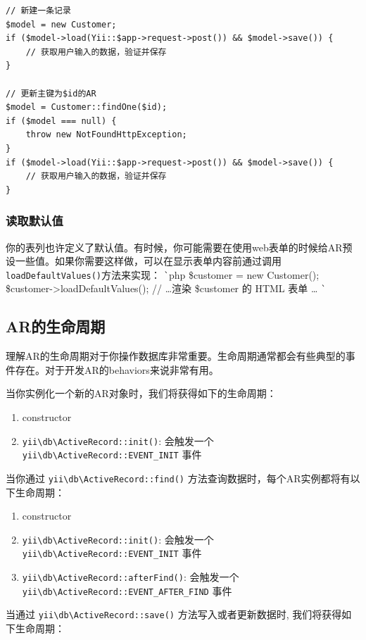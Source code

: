 \lstset{language=php}\begin{lstlisting}
// 新建一条记录
$model = new Customer;
if ($model->load(Yii::$app->request->post()) && $model->save()) {
    // 获取用户输入的数据，验证并保存
}

// 更新主键为$id的AR
$model = Customer::findOne($id);
if ($model === null) {
    throw new NotFoundHttpException;
}
if ($model->load(Yii::$app->request->post()) && $model->save()) {
    // 获取用户输入的数据，验证并保存
}
\end{lstlisting}
\subsubsection{读取默认值}
你的表列也许定义了默认值。有时候，你可能需要在使用web表单的时候给AR预设一些值。如果你需要这样做，可以在显示表单内容前通过调用\lstinline|loadDefaultValues()|方法来实现：
\lstinline|`|php
\$customer = new Customer();
\$customer->loadDefaultValues();
// \ldots 渲染 \$customer 的 HTML 表单 \ldots
\lstinline|`|

\subsection{AR的生命周期}
理解AR的生命周期对于你操作数据库非常重要。生命周期通常都会有些典型的事件存在。对于开发AR的behaviors来说非常有用。

当你实例化一个新的AR对象时，我们将获得如下的生命周期：

\begin{enumerate}
\item constructor
\item \texttt{yii{\allowbreak{}\textbackslash}db{\allowbreak{}\textbackslash}ActiveRecord\allowbreak{}::\allowbreak{}init()}: 会触发一个 \texttt{yii{\allowbreak{}\textbackslash}db{\allowbreak{}\textbackslash}ActiveRecord\allowbreak{}::\allowbreak{}EVENT\_INIT} 事件
\end{enumerate}
当你通过 \texttt{yii{\allowbreak{}\textbackslash}db{\allowbreak{}\textbackslash}ActiveRecord\allowbreak{}::\allowbreak{}find()} 方法查询数据时，每个AR实例都将有以下生命周期：

\begin{enumerate}
\item constructor
\item \texttt{yii{\allowbreak{}\textbackslash}db{\allowbreak{}\textbackslash}ActiveRecord\allowbreak{}::\allowbreak{}init()}: 会触发一个 \texttt{yii{\allowbreak{}\textbackslash}db{\allowbreak{}\textbackslash}ActiveRecord\allowbreak{}::\allowbreak{}EVENT\_INIT} 事件
\item \texttt{yii{\allowbreak{}\textbackslash}db{\allowbreak{}\textbackslash}ActiveRecord\allowbreak{}::\allowbreak{}afterFind()}: 会触发一个 \texttt{yii{\allowbreak{}\textbackslash}db{\allowbreak{}\textbackslash}ActiveRecord\allowbreak{}::\allowbreak{}EVENT\_AFTER\_FIND} 事件
\end{enumerate}
当通过 \texttt{yii{\allowbreak{}\textbackslash}db{\allowbreak{}\textbackslash}ActiveRecord\allowbreak{}::\allowbreak{}save()} 方法写入或者更新数据时, 我们将获得如下生命周期：

